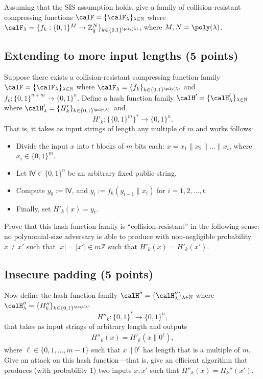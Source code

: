 \documentclass{article}
\begin{document}
Assuming that the SIS assumption holds, give a family of collision-resistant compressing functions $\calF = \{\calF_\lambda\}_{\lambda \in \mathbb{N}}$ where $\calF_\lambda = \{f_k: \{0,1\}^M \rightarrow \mathbb{Z}_q^N\}_{k \in \{0,1\}^{\poly(\lambda)}}$, where $M, N = \poly(\lambda)$.

\subsection{Extending to more input lengths (5 points)}
Suppose there exists a collision-resistant compressing function family $\calF = \{\calF_\lambda\}_{\lambda \in \mathbb{N}}$ where $\calF_\lambda = \{f_k\}_{k \in \{0,1\}^{\poly(\lambda)}}$ and
$f_{k} : \{0,1\}^{n + m} \to \{0,1\}^n$. Define a hash function family $\calH' = \{\calH'_{\lambda}\}_{\lambda \in \mathbb{N}}$ where $\calH'_{\lambda} = \{H'_k\}_{k \in \{0,1\}^{\poly(\lambda)}}$ and 
$$H'_{k}: \{\{0,1\}^{m}\}^* \to \{0,1\}^n.$$ 
That is, it takes as input strings of length any multiple of $m$ and works follows:
\begin{itemize}
    \item Divide the input $x$ into $t$ blocks of $m$ bits each: $x = x_1 \| x_2 \| \ldots \| x_t$, where $x_i \in \{0,1\}^m$. 
    \item Let $\mathsf{IV} \in \{0,1\}^n$ be an arbitrary fixed public string. \item Compute $y_0 := \mathsf{IV}$, and $y_i := f_k(y_{i-1} \| x_i)$ for $i = 1, 2, \ldots, t$. 
    \item Finally, set $H'_{k}(x) = y_t$. 
\end{itemize}
Prove that this hash function family is ``collision-resistant'' in the following sense: no polynomial-size adversary is able to produce with non-negligible probability $x \neq x'$ such that $|x| = |x'| \in m \mathbb{Z}$ such that $H'_{k}(x) = H'_{k}(x')$.

\subsection{Insecure padding (5 points)}\label{sec:insecure-padding}
Now define the hash function family $\calH'' = \{\calH''_\lambda\}_{\lambda \in \mathbb{N}}$ where $\calH''_\lambda = \{H''_k \}_{k \in \{0,1\}^{\poly(\lambda)}}$
\[
H''_{k} : \{0,1\}^* \to \{0,1\}^n,
\]
that takes as input strings of arbitrary length and outputs
\begin{align*}
    H''_k(x) = H'_{k}(x\| 0^{\ell}),
\end{align*}
where $\ell \in \{0,1, \ldots, m-1\}$ such that $x\|0^{\ell}$ has length that is a multiple of $m$. Give an attack on this hash function---that is, give an efficient algorithm that produces (with probability 1) two inputs $x, x'$ such that $H''_k(x) = H_k''(x')$.
\end{document}
